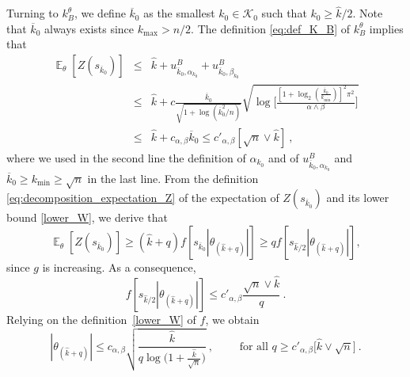 \documentclass[twoside,11pt]{article}
\def\beq{\begin{equation}}
\def\eeq{\end{equation}}
\def\cK{\mathcal{K}}
\newcommand{\E}{\operatorname{\mathbb{E}}}
\newcommand{\<}{\langle}
\renewcommand{\>}{\rangle}
\begin{document}
Turning to $k^{\theta}_B$, we define $\overline{k}_0$ as the smallest $k_0\in \cK_0$ such that $k_0\geq \widehat{k}/2$. Note that $\overline{k}_0$ always exists since $k_{\max}>n/2$.
The definition \eqref{eq:def_K_B} of $k^{\theta}_{B}$ implies that 
\begin{eqnarray}\nonumber
 \E_{\theta}[Z(s_{\overline{k}_0})]&\leq& \widehat{k} + u^{B}_{\overline{k}_0, \alpha_{k_0}}+ u^{B}_{\overline{k}_0, \beta_{k_0}}\\ \nonumber &\leq& \widehat{k} + c \frac{\overline{k}_0}{\sqrt{1+ \log(\overline{k}^2_0/n)} }\sqrt{\log\Big[\frac{[1+\log_2(\frac{\overline{k}_0}{k_{\min}})]^2\pi^2}{\alpha\wedge \beta}\Big]}\\
 &\leq & \widehat{k} + c_{\alpha,\beta} \overline{k}_0\leq c'_{\alpha,\beta}[\sqrt{n} \vee \widehat{k}] \ , \label{eq:etape0}
\end{eqnarray}
where we used in the second line the definition of $\alpha_{k_0}$ and of $u^{B}_{\overline{k}_0,\alpha_{k_0}}$ and $\overline{k}_0\geq k_{\min}\geq \sqrt{n}$ in the last line. From the definition 
\eqref{eq:decomposition_expectation_Z} of the expectation of $Z(s_{\overline{k}_0})$ and its lower bound \eqref{lower_W}, we derive that
\[\E_{\theta}[Z(s_{\overline{k}_0})]\geq (\widehat{k}+q)f[s_{\overline{k}_0} |\theta_{(\widehat{k}+q)}|]\geq q f[s_{\widehat{k}/2} |\theta_{(\widehat{k}+q)}|], \]
since $g$ is increasing. As a consequence, 
\[
 f[s_{\widehat{k}/2} |\theta_{(\widehat{k}+q)}|]\leq  c'_{\alpha,\beta}\frac{\sqrt{n} \vee \widehat{k}}{q}\ . 
\]
Relying on the definition~\eqref{lower_W} of $f$, we obtain 
\beq\label{eq:puissance_estim_B}
 |\theta_{(\widehat{k}+q)}|\leq c_{\alpha,\beta}\sqrt{\frac{\widehat{k}}{q\log\big(1+\frac{\widehat{k}}{\sqrt{n}}\big)}}\ , \quad \quad \text{ for all }q\geq c'_{\alpha,\beta}\big[\widehat{k}\vee \sqrt{n}\big]\ .
\eeq

\bigskip 
\end{document}
